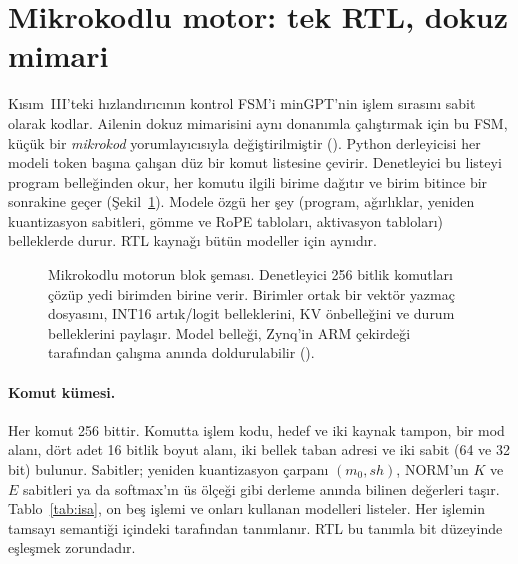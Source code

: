 \section{Mikrokodlu motor: tek RTL, dokuz mimari}\label{sec:motor}

Kısım~III'teki hızlandırıcının kontrol FSM'i minGPT'nin işlem sırasını sabit olarak kodlar. Ailenin dokuz mimarisini aynı donanımla çalıştırmak için bu FSM, küçük bir \emph{mikrokod} yorumlayıcısıyla değiştirilmiştir (). Python derleyicisi her modeli token başına çalışan düz bir komut listesine çevirir. Denetleyici bu listeyi program belleğinden okur, her komutu ilgili birime dağıtır ve birim bitince bir sonrakine geçer (Şekil~\ref{fig:zoo-motor}). Modele özgü her şey (program, ağırlıklar, yeniden kuantizasyon sabitleri, gömme ve RoPE tabloları, aktivasyon tabloları) belleklerde durur. RTL kaynağı bütün modeller için aynıdır.

\begin{figure}[h]
  \centering
  \caption[Mikrokodlu zoo motoru]{Mikrokodlu motorun blok şeması. Denetleyici 256 bitlik komutları çözüp yedi birimden birine verir. Birimler ortak bir vektör yazmaç dosyasını, INT16 artık/logit belleklerini, KV önbelleğini ve durum belleklerini paylaşır. Model belleği, Zynq'in ARM çekirdeği tarafından çalışma anında doldurulabilir ().}
  \label{fig:zoo-motor}
\end{figure}

\paragraph{Komut kümesi.} Her komut 256 bittir. Komutta işlem kodu, hedef ve iki kaynak tampon, bir mod alanı, dört adet 16 bitlik boyut alanı, iki bellek taban adresi ve iki sabit (64 ve 32 bit) bulunur. Sabitler; yeniden kuantizasyon çarpanı $(m_0, sh)$, NORM'un $K$ ve $E$ sabitleri ya da softmax'ın üs ölçeği gibi derleme anında bilinen değerleri taşır. Tablo~\ref{tab:isa}, on beş işlemi ve onları kullanan modelleri listeler. Her işlemin tamsayı semantiği  içindeki  tarafından tanımlanır. RTL bu tanımla bit düzeyinde eşleşmek zorundadır.

